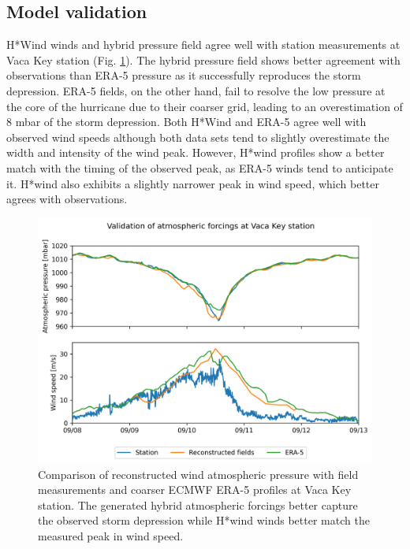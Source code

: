 \documentclass[11pt,a4paper]{article}
\begin{document}
\subsection{Model validation}

H*Wind winds and hybrid pressure field agree well with station measurements at Vaca Key station (Fig. \ref{fig:forcings}). The hybrid pressure field shows better agreement with observations than ERA-5 pressure as it successfully reproduces the storm depression. ERA-5 fields, on the other hand, fail to resolve the low pressure at the core of the hurricane due to their coarser grid, leading to an overestimation of 8 mbar of the storm depression. Both H*Wind and ERA-5 agree well with observed wind speeds although both data sets tend to slightly overestimate the width and intensity of the wind peak. However, H*wind profiles show a better match with the timing of the observed peak, as ERA-5 winds tend to anticipate it. H*wind also exhibits a slightly narrower peak in wind speed, which better agrees with observations.

\begin{figure}
    \centering
    \includegraphics[width=.95\textwidth]{fig/validation_met_2.png}
    \caption{Comparison of reconstructed wind atmospheric pressure with field measurements and coarser ECMWF ERA-5 profiles at Vaca Key station. The generated hybrid atmospheric forcings better capture the observed storm depression while H*wind winds better match the measured peak in wind speed.}
    \label{fig:forcings}
\end{figure}
\end{document}
